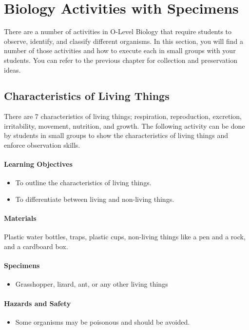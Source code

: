 \chapter{Biology Activities with Specimens}
There are a number of activities in O-Level Biology that require students to observe, identify, and classify different organisms. In this section, you will find a number of those activities and how to execute each in small groups with your students. You can refer to the previous chapter for collection and preservation ideas.

\section{Characteristics of Living Things}
There are 7 characteristics of living things; respiration, reproduction, excretion, irritability, movement, nutrition, and growth. The following activity can be done by students in small groups to show the characteristics of living things and enforce observation skills.

\subsubsection*{Learning Objectives}
\begin{itemize}
\item{To outline the characteristics of living things.}
\item{To differentiate between living and non-living things.}
\end{itemize}

\subsubsection*{Materials}
Plastic water bottles, traps, plastic cups, non-living things like a pen and a rock, and a cardboard box.

\subsubsection*{Specimens}
\begin{itemize}
\item{Grasshopper, lizard, ant, or any other living things}
\end{itemize}

\subsubsection*{Hazards and Safety}
\begin{itemize}
\item{Some organisms may be poisonous and should be avoided.}
\end{itemize}

